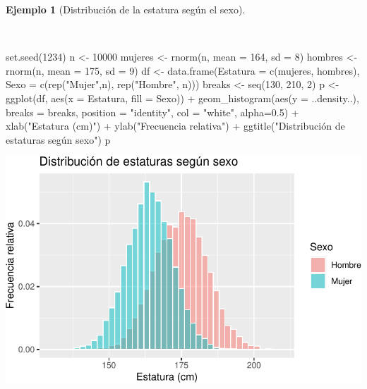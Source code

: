 \documentclass[
  a4paper,
]{scrreport}
\newenvironment{Shaded}{\begin{snugshade}}{\end{snugshade}}
\newcommand{\AttributeTok}[1]{\textcolor[rgb]{0.40,0.45,0.13}{#1}}
\newcommand{\DecValTok}[1]{\textcolor[rgb]{0.68,0.00,0.00}{#1}}
\newcommand{\FloatTok}[1]{\textcolor[rgb]{0.68,0.00,0.00}{#1}}
\newcommand{\FunctionTok}[1]{\textcolor[rgb]{0.28,0.35,0.67}{#1}}
\newcommand{\NormalTok}[1]{\textcolor[rgb]{0.00,0.23,0.31}{#1}}
\newcommand{\OtherTok}[1]{\textcolor[rgb]{0.00,0.23,0.31}{#1}}
\newcommand{\SpecialCharTok}[1]{\textcolor[rgb]{0.37,0.37,0.37}{#1}}
\newcommand{\StringTok}[1]{\textcolor[rgb]{0.13,0.47,0.30}{#1}}
\theoremstyle{plain}
\theoremstyle{definition}
\theoremstyle{definition}
\newtheorem{example}{Ejemplo}[chapter]
\theoremstyle{remark}
\begin{document}
\begin{example}[Distribución de la estatura según el
sexo]\protect\hypertarget{exm-distribucion-estaturas-sexo}{}\label{exm-distribucion-estaturas-sexo}

~

\begin{Shaded}
\begin{Highlighting}[]
\FunctionTok{set.seed}\NormalTok{(}\DecValTok{1234}\NormalTok{)}
\NormalTok{n }\OtherTok{\textless{}{-}} \DecValTok{10000}
\NormalTok{mujeres }\OtherTok{\textless{}{-}} \FunctionTok{rnorm}\NormalTok{(n, }\AttributeTok{mean =} \DecValTok{164}\NormalTok{, }\AttributeTok{sd =} \DecValTok{8}\NormalTok{)}
\NormalTok{hombres }\OtherTok{\textless{}{-}} \FunctionTok{rnorm}\NormalTok{(n, }\AttributeTok{mean =} \DecValTok{175}\NormalTok{, }\AttributeTok{sd =} \DecValTok{9}\NormalTok{)}
\NormalTok{df }\OtherTok{\textless{}{-}} \FunctionTok{data.frame}\NormalTok{(}\AttributeTok{Estatura =} \FunctionTok{c}\NormalTok{(mujeres, hombres), }\AttributeTok{Sexo =} \FunctionTok{c}\NormalTok{(}\FunctionTok{rep}\NormalTok{(}\StringTok{"Mujer"}\NormalTok{,n), }\FunctionTok{rep}\NormalTok{(}\StringTok{"Hombre"}\NormalTok{, n)))}
\NormalTok{breaks }\OtherTok{\textless{}{-}} \FunctionTok{seq}\NormalTok{(}\DecValTok{130}\NormalTok{, }\DecValTok{210}\NormalTok{, }\DecValTok{2}\NormalTok{)}
\NormalTok{p }\OtherTok{\textless{}{-}} \FunctionTok{ggplot}\NormalTok{(df, }\FunctionTok{aes}\NormalTok{(}\AttributeTok{x =}\NormalTok{ Estatura, }\AttributeTok{fill =}\NormalTok{ Sexo)) }\SpecialCharTok{+}
    \FunctionTok{geom\_histogram}\NormalTok{(}\FunctionTok{aes}\NormalTok{(}\AttributeTok{y =}\NormalTok{ ..density..), }\AttributeTok{breaks =}\NormalTok{ breaks, }\AttributeTok{position =} \StringTok{"identity"}\NormalTok{, }\AttributeTok{col =} \StringTok{"white"}\NormalTok{, }\AttributeTok{alpha=}\FloatTok{0.5}\NormalTok{) }\SpecialCharTok{+}
    \FunctionTok{xlab}\NormalTok{(}\StringTok{"Estatura (cm)"}\NormalTok{) }\SpecialCharTok{+}
    \FunctionTok{ylab}\NormalTok{(}\StringTok{"Frecuencia relativa"}\NormalTok{) }\SpecialCharTok{+}
    \FunctionTok{ggtitle}\NormalTok{(}\StringTok{"Distribución de estaturas según sexo"}\NormalTok{)}
\NormalTok{p}
\end{Highlighting}
\end{Shaded}

\includegraphics{02-estadistica-descriptiva_files/figure-pdf/histograma-estatura-sexo-1.pdf}


\end{example}
\end{document}
